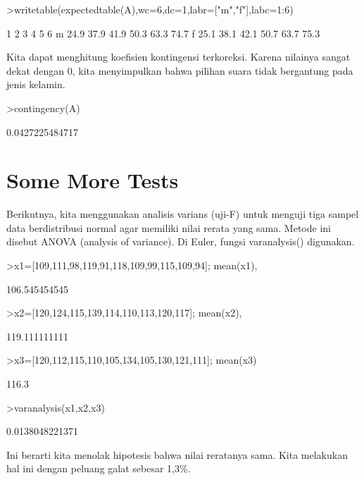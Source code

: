 \documentclass{article}
\newenvironment{eulernotebook}{\par}{\par}
\newcommand{\eulerheading}[1]{\section{#1}}
\newenvironment{eulercomment}{\par\medskip}{\par\medskip}
\begin{document}
\begin{eulernotebook}
\begin{eulerprompt}
>writetable(expectedtable(A),wc=6,dc=1,labr=["m","f"],labc=1:6)
\end{eulerprompt}
\begin{euleroutput}
             1     2     3     4     5     6
       m  24.9  37.9  41.9  50.3  63.3  74.7
       f  25.1  38.1  42.1  50.7  63.7  75.3
\end{euleroutput}
\begin{eulercomment}
Kita dapat menghitung koefisien kontingensi terkoreksi. Karena
nilainya sangat dekat dengan 0, kita menyimpulkan bahwa pilihan suara
tidak bergantung pada jenis kelamin.
\end{eulercomment}
\begin{eulerprompt}
>contingency(A)
\end{eulerprompt}
\begin{euleroutput}
  0.0427225484717
\end{euleroutput}
\begin{eulercomment}
\begin{eulercomment}
\eulerheading{Some More Tests}
\begin{eulercomment}
Berikutnya, kita menggunakan analisis varians (uji-F) untuk menguji
tiga sampel data berdistribusi normal agar memiliki nilai rerata yang
sama. Metode ini disebut ANOVA (analysis of variance). Di Euler,
fungsi varanalysis() digunakan.
\end{eulercomment}
\begin{eulerprompt}
>x1=[109,111,98,119,91,118,109,99,115,109,94]; mean(x1),
\end{eulerprompt}
\begin{euleroutput}
  106.545454545
\end{euleroutput}
\begin{eulerprompt}
>x2=[120,124,115,139,114,110,113,120,117]; mean(x2),
\end{eulerprompt}
\begin{euleroutput}
  119.111111111
\end{euleroutput}
\begin{eulerprompt}
>x3=[120,112,115,110,105,134,105,130,121,111]; mean(x3)
\end{eulerprompt}
\begin{euleroutput}
  116.3
\end{euleroutput}
\begin{eulerprompt}
>varanalysis(x1,x2,x3)
\end{eulerprompt}
\begin{euleroutput}
  0.0138048221371
\end{euleroutput}
\begin{eulercomment}
Ini berarti kita menolak hipotesis bahwa nilai reratanya sama. Kita
melakukan hal ini dengan peluang galat sebesar 1,3\%.


\end{eulercomment}
\end{eulercomment}
\end{eulercomment}
\end{eulernotebook}
\end{document}

